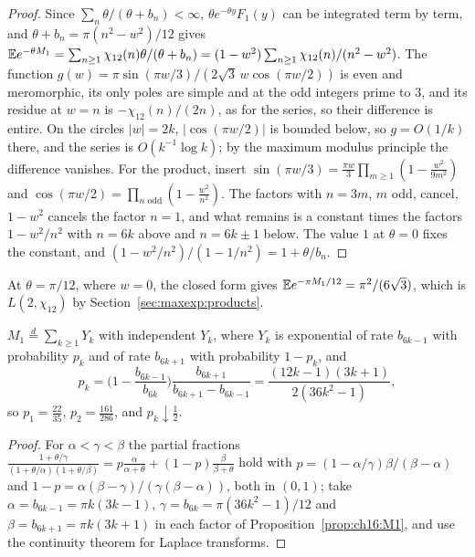 \begin{proof}
Since $\sum_n\theta/(\theta+b_n)<\infty$, $\theta e^{-\theta y}F_1(y)$ can be integrated term by term, and $\theta+b_n=\pi(n^2-w^2)/12$ gives $\mathbb{E} e^{-\theta M_1}=\sum_{n\ge1}\chi_{12}(n)\theta/(\theta+b_n)=(1-w^2)\sum_{n\ge1}\chi_{12}(n)/(n^2-w^2)$. The function $g(w)=\pi\sin(\pi w/3)/(2\sqrt3\,w\cos(\pi w/2))$ is even and meromorphic, its only poles are simple and at the odd integers prime to $3$, and its residue at $w=n$ is $-\chi_{12}(n)/(2n)$, as for the series, so their difference is entire. On the circles $|w|=2k$, $|\cos(\pi w/2)|$ is bounded below, so $g=O(1/k)$ there, and the series is $O(k^{-1}\log k)$; by the maximum modulus principle the difference vanishes. For the product, insert $\sin(\pi w/3)=\frac{\pi w}3\prod_{m\ge1}(1-\frac{w^2}{9m^2})$ and $\cos(\pi w/2)=\prod_{n\text{ odd}}(1-\frac{w^2}{n^2})$. The factors with $n=3m$, $m$ odd, cancel, $1-w^2$ cancels the factor $n=1$, and what remains is a constant times the factors $1-w^2/n^2$ with $n=6k$ above and $n=6k\pm1$ below. The value $1$ at $\theta=0$ fixes the constant, and $(1-w^2/n^2)/(1-1/n^2)=1+\theta/b_n$.
\end{proof}

At $\theta=\pi/12$, where $w=0$, the closed form gives $\mathbb{E} e^{-\pi M_1/12}=\pi^2/(6\sqrt3)$, which is $L(2,\chi_{12})$ by Section~\ref{sec:maxexp:products}.

\begin{corollary}\label{cor:maxexp:renyi}
$M_1\overset d=\sum_{k\ge1}Y_k$ with independent $Y_k$, where $Y_k$ is exponential of rate $b_{6k-1}$ with probability $p_k$ and of rate $b_{6k+1}$ with probability $1-p_k$, and
\[
p_k=\Big(1-\frac{b_{6k-1}}{b_{6k}}\Big)\frac{b_{6k+1}}{b_{6k+1}-b_{6k-1}}=\frac{(12k-1)(3k+1)}{2(36k^2-1)},
\]
so $p_1=\frac{22}{35}$, $p_2=\frac{161}{286}$, and $p_k\downarrow\frac12$.
\end{corollary}

\begin{proof}
For $\alpha<\gamma<\beta$ the partial fractions $\frac{1+\theta/\gamma}{(1+\theta/\alpha)(1+\theta/\beta)}=p\frac\alpha{\alpha+\theta}+(1-p)\frac\beta{\beta+\theta}$ hold with $p=(1-\alpha/\gamma)\beta/(\beta-\alpha)$ and $1-p=\alpha(\beta-\gamma)/(\gamma(\beta-\alpha))$, both in $(0,1)$; take $\alpha=b_{6k-1}=\pi k(3k-1)$, $\gamma=b_{6k}=\pi(36k^2-1)/12$ and $\beta=b_{6k+1}=\pi k(3k+1)$ in each factor of Proposition~\ref{prop:ch16:M1}, and use the continuity theorem for Laplace transforms.
\end{proof}

